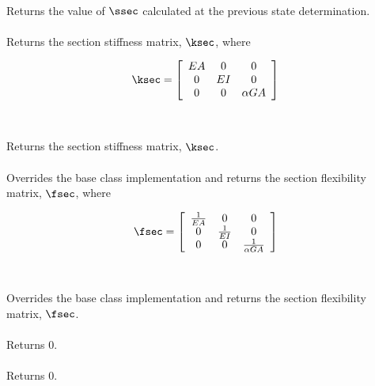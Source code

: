  \\
Returns the value of $\ssec$ calculated at the previous state determination. \\

 \\
Returns the section stiffness matrix, $\ksec$, where 

\begin{equation}
\ksec = \left[
   \begin{array}{ccc}
       EA &  0 &  0 \\
        0 & EI &  0 \\
        0 &  0 & \alpha GA
   \end{array} 
 \right]
\end{equation} \\

 \\
Returns the section stiffness matrix, $\ksec$. \\

 \\
Overrides the base class implementation and returns the section
flexibility matrix, $\fsec$, where

\begin{equation}
\fsec = \left[
   \begin{array}{ccc}
       \frac{1}{EA} &            0 &                  0  \\
                  0 & \frac{1}{EI} &                  0  \\
                  0 &            0 & \frac{1}{\alpha GA}
   \end{array} 
 \right]
\end{equation} \\

 \\
Overrides the base class implementation and returns the section
flexibility matrix, $\fsec$. \\

 \\
Returns $0$. \\

 \\
Returns $0$. \\

